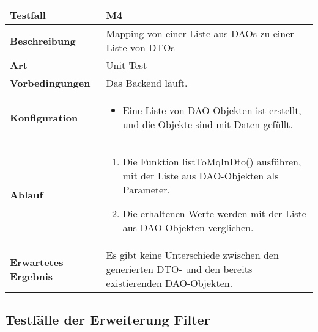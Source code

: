 \begin{longtable}{p{}|p{}}
	\hline
	\textbf{Testfall}               & \textbf{M4} \\
	\hline
	\textbf{Beschreibung}   		& Mapping von einer Liste aus DAOs zu einer Liste von DTOs \\
	\hline
	\textbf{Art}    				& Unit-Test \\
	\hline
	\textbf{Vorbedingungen}    		& Das Backend läuft. \\
	\hline
	\textbf{Konfiguration}   	 	& 
	\begin{itemize}
		\item Eine Liste von DAO-Objekten ist erstellt, und die Objekte sind mit Daten gefüllt.
	\end{itemize} \\
	\hline
	\textbf{Ablauf}    				& 
	\begin{enumerate}
		\item Die Funktion listToMqInDto() ausführen, mit der Liste aus DAO-Objekten als Parameter.
		\item Die erhaltenen Werte werden mit der Liste aus DAO-Objekten verglichen.
	\end{enumerate} \\
	\hline
	\textbf{Erwartetes Ergebnis}    & Es gibt keine Unterschiede zwischen den generierten DTO- und den bereits existierenden DAO-Objekten. \\
	\hline
\end{longtable}\label{tab:testfall-M4}


\subsection{Testfälle der Erweiterung Filter}

